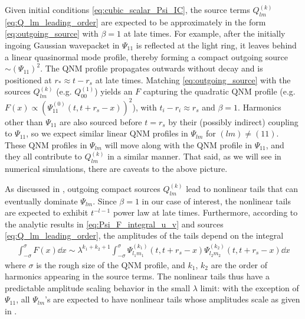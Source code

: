 Given initial conditions \eqref{eq:cubic_scalar_Psi_IC}, the source terms $Q_{lm}^{(k)}$ \eqref{eq:Q_lm_leading_order} are expected to be approximately in the form \eqref{eq:outgoing_source} with $\beta=1$ at late times.
For example, after the initially ingoing Gaussian wavepacket in $\Psi_{11}$ is reflected at the light ring, it leaves behind a linear quasinormal mode profile, thereby forming a compact outgoing source $\sim (\Psi_{11})^2$.
The QNM profile propagates outwards without decay and is positioned at $r_* \approx t - r_s$ at late times.
Matching \eqref{eq:outgoing_source} with the sources $Q_{lm}^{(k)}$ (e.g. $Q_{00}^{(1)}$) yields an $F$ capturing the quadratic QNM profile (e.g. $F(x) \propto (\Psi_{11}^{(0)}(t,t+r_s-x))^2$), with $t_i-r_i \approx r_s$ and $\beta = 1$.
Harmonics other than $\Psi_{11}$ are also sourced before $t = r_s$ by their (possibly indirect) coupling to $\Psi_{11}$, so we expect similar linear QNM profiles in $\Psi_{lm}$  for $(lm) \neq (11)$.
These QNM profiles in $\Psi_{lm}$ will move along with the QNM profile in $\Psi_{11}$, and they all contribute to $Q_{lm}^{(k)}$ in a similar manner.
That said, as we will see in numerical simulations, there are caveats to the above picture.



As discussed in , outgoing compact sources $Q_{lm}^{(k)}$ lead to nonlinear tails that can eventually dominate $\Psi_{lm}$.
Since $\beta = 1$ in our case of interest, the nonlinear tails are expected to exhibit $t^{-l-1}$ power law at late times.
Furthermore, according to the analytic results in \eqref{eq:Psi_F_integral_u_v} and sources \eqref{eq:Q_lm_leading_order}, the amplitudes of the tails depend on the integral
\begin{align}
  \label{eq:approximate_F}
  \int_{-\sigma}^\sigma F(x) \dd{x} \sim \lambda^{k_1 + k_2 + 1} \int_{-\sigma}^\sigma \Psi_{l_1 m_1}^{(k_1)}(t,t+r_s-x) \Psi_{l_2 m_2}^{(k_2)}(t,t+r_s-x) \dd{x}
\end{align}
where $\sigma$ is the rough size of the QNM profile, and $k_1$, $k_2$ are the order of harmonics appearing in the source terms.
The nonlinear tails thus have a predictable amplitude scaling behavior in the small $\lambda$ limit: with the exception of $\Psi_{11}$, all $\Psi_{lm}$'s are expected to have nonlinear tails whose amplitudes scale as given in .



